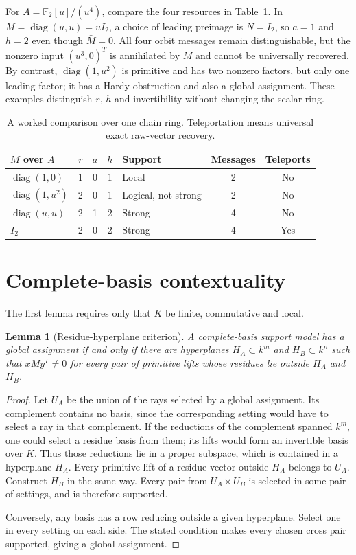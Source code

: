 \documentclass[11pt]{article}
\newtheorem{lemma}[theorem]{Lemma}
\theoremstyle{definition}\newtheorem{definition}[theorem]{Definition}
\theoremstyle{remark}\newtheorem{remark}[theorem]{Remark}
\newcommand{\F}{\mathbb F}
\newcommand{\A}{\F_2[u]/(u^4)}
\DeclareMathOperator{\diag}{diag}
\begin{document}
For $A=\A$, compare the four resources in Table~\ref{tab:examples}. In $M=\diag(u,u)=uI_2$, a choice of leading preimage is $N=I_2$, so $a=1$ and $h=2$ even though $\bar M=0$. All four orbit messages remain distinguishable, but the nonzero input $(u^3,0)^T$ is annihilated by $M$ and cannot be universally recovered. By contrast, $\diag(1,u^2)$ is primitive and has two nonzero factors, but only one leading factor; it has a Hardy obstruction and also a global assignment. These examples distinguish $r$, $h$ and invertibility without changing the scalar ring.
\begin{table}[ht]\centering\small
\begin{tabular}{lccclcc}
\toprule
$M$ over $A$ & $r$ & $a$ & $h$ & Support & Messages & Teleports\\\midrule
$\diag(1,0)$ & 1 & 0 & 1 & Local & 2 & No\\
$\diag(1,u^2)$ & 2 & 0 & 1 & Logical, not strong & 2 & No\\
$\diag(u,u)$ & 2 & 1 & 2 & Strong & 4 & No\\
$I_2$ & 2 & 0 & 2 & Strong & 4 & Yes\\\bottomrule
\end{tabular}
\caption{A worked comparison over one chain ring. Teleportation means universal exact raw-vector recovery.}\label{tab:examples}
\end{table}

\section{Complete-basis contextuality}\label{sec:classification}
The first lemma requires only that $K$ be finite, commutative and local.
\begin{lemma}[Residue-hyperplane criterion]\label{lem:hyperplane}
A complete-basis support model has a global assignment if and only if there are hyperplanes $H_A\subset k^m$ and $H_B\subset k^n$ such that $xMy^T\ne0$ for every pair of primitive lifts whose residues lie outside $H_A$ and $H_B$.
\end{lemma}
\begin{proof}
Let $U_A$ be the union of the rays selected by a global assignment. Its complement contains no basis, since the corresponding setting would have to select a ray in that complement. If the reductions of the complement spanned $k^m$, one could select a residue basis from them; its lifts would form an invertible basis over $K$. Thus those reductions lie in a proper subspace, which is contained in a hyperplane $H_A$. Every primitive lift of a residue vector outside $H_A$ belongs to $U_A$. Construct $H_B$ in the same way. Every pair from $U_A\times U_B$ is selected in some pair of settings, and is therefore supported.

Conversely, any basis has a row reducing outside a given hyperplane. Select one in every setting on each side. The stated condition makes every chosen cross pair supported, giving a global assignment.
\end{proof}
\end{document}
